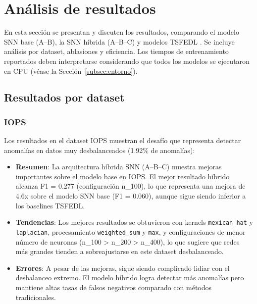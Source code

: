 \section{Análisis de resultados}

En esta sección se presentan y discuten los resultados, comparando el modelo SNN base (A--B), la SNN híbrida (A--B--C) y modelos TSFEDL \cite{AGUILERAMARTOS2023223}. Se incluye análisis por dataset, ablasiones y eficiencia. Los tiempos de entrenamiento reportados deben interpretarse considerando que todos los modelos se ejecutaron en CPU (véase la Sección~\ref{subsec:entorno}).

\subsection{Resultados por dataset}

\subsubsection{IOPS}
Los resultados en el dataset IOPS muestran el desafío que representa detectar anomalías en datos muy desbalanceados (1.92\% de anomalías):
\begin{itemize}
    \item \textbf{Resumen}: La arquitectura híbrida SNN (A--B--C) muestra mejoras importantes sobre el modelo base en IOPS. El mejor resultado híbrido alcanza F1 = 0.277 (configuración n\_100), lo que representa una mejora de 4.6x sobre el modelo SNN base (F1 = 0.060), aunque sigue siendo inferior a los baselines TSFEDL.
    \item \textbf{Tendencias}: Los mejores resultados se obtuvieron con kernels \texttt{mexican\_hat} y \texttt{laplacian}, procesamiento \texttt{weighted\_sum} y \texttt{max}, y configuraciones de menor número de neuronas (n\_100 > n\_200 > n\_400), lo que sugiere que redes más grandes tienden a sobreajustarse en este dataset desbalanceado.
    \item \textbf{Errores}: A pesar de las mejoras, sigue siendo complicado lidiar con el desbalanceo extremo. El modelo híbrido logra detectar más anomalías pero mantiene altas tasas de falsos negativos comparado con métodos tradicionales.
\end{itemize}

